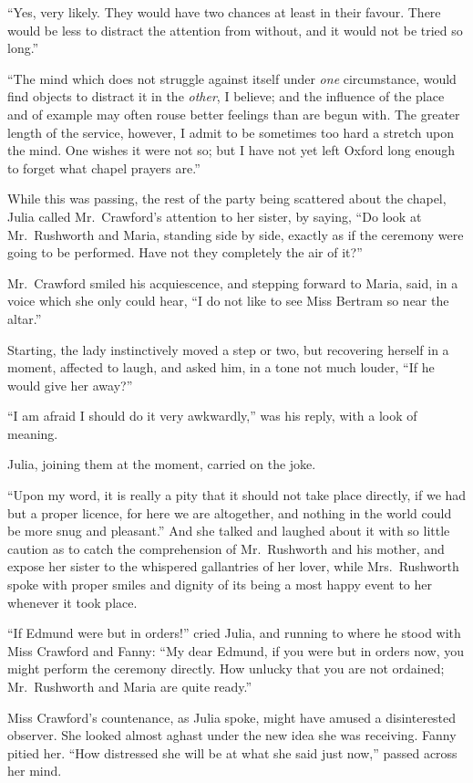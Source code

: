 ``Yes, very likely.  They would have two chances at least
in their favour.  There would be less to distract the
attention from without, and it would not be tried so long.''

``The mind which does not struggle against itself under
\emph{one} circumstance, would find objects to distract it
in the \emph{other}, I believe; and the influence of the place
and of example may often rouse better feelings than are
begun with.  The greater length of the service, however,
I admit to be sometimes too hard a stretch upon the mind.
One wishes it were not so; but I have not yet left
Oxford long enough to forget what chapel prayers are.''

While this was passing, the rest of the party being scattered
about the chapel, Julia called Mr.\ Crawford's attention to
her sister, by saying, ``Do look at Mr.\ Rushworth and Maria,
standing side by side, exactly as if the ceremony were
going to be performed.  Have not they completely the air of it?''

Mr.\ Crawford smiled his acquiescence, and stepping forward
to Maria, said, in a voice which she only could hear,
``I do not like to see Miss Bertram so near the altar.''

Starting, the lady instinctively moved a step or two,
but recovering herself in a moment, affected to laugh,
and asked him, in a tone not much louder, ``If he would give
her away?''

``I am afraid I should do it very awkwardly,'' was his reply,
with a look of meaning.

Julia, joining them at the moment, carried on the joke.

``Upon my word, it is really a pity that it should not
take place directly, if we had but a proper licence,
for here we are altogether, and nothing in the world
could be more snug and pleasant.''  And she talked and
laughed about it with so little caution as to catch the
comprehension of Mr.\ Rushworth and his mother, and expose
her sister to the whispered gallantries of her lover,
while Mrs.\ Rushworth spoke with proper smiles and dignity
of its being a most happy event to her whenever it took place.

``If Edmund were but in orders!'' cried Julia, and running
to where he stood with Miss Crawford and Fanny:
``My dear Edmund, if you were but in orders now, you might
perform the ceremony directly.  How unlucky that you
are not ordained; Mr.\ Rushworth and Maria are quite ready.''

Miss Crawford's countenance, as Julia spoke, might have
amused a disinterested observer.  She looked almost aghast
under the new idea she was receiving.  Fanny pitied her.
``How distressed she will be at what she said just now,''
passed across her mind.

